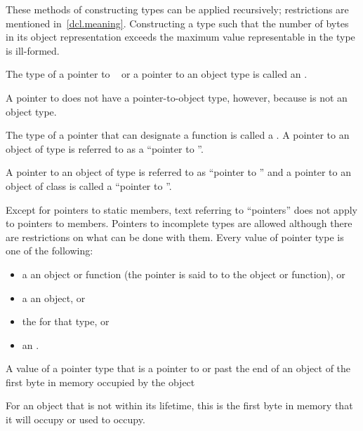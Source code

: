 \pnum
These methods of constructing types can be applied recursively;
restrictions are mentioned in~\ref{dcl.meaning}.
Constructing a type such that the number of
bytes in its object representation exceeds the maximum value representable in
the type  is ill-formed.

\pnum
{}%
The type of a pointer to \cv{}~ or a pointer to an object type is
called an .
\begin{note}
A pointer to 
does not have a pointer-to-object type, however, because  is not
an object type.
\end{note}
The type of a pointer that can designate a function
is called a .
A pointer to an object of type  is referred to as a ``pointer to
''.
\begin{example}
A pointer to an object of type  is
referred to as ``pointer to '' and a pointer to an object of
class  is called a ``pointer to ''.
\end{example}
Except for pointers to static members, text referring to ``pointers''
does not apply to pointers to members. Pointers to incomplete types are
allowed although there are restrictions on what can be done with
them.
%
Every value of pointer type is one of the following:
\begin{itemize}
\item
a  an object or function (the pointer is said to  to the object or function), or
\item
a  an object, or
\item
{}
the  for that type, or
\item
{}
an .
\end{itemize}
A value of a
pointer type
that is a pointer to or past the end of an object
 of
the first byte in memory occupied by the object
\begin{footnote}
For an object that is not within its lifetime,
this is the first byte in memory that it will occupy or used to occupy.
\end{footnote}
